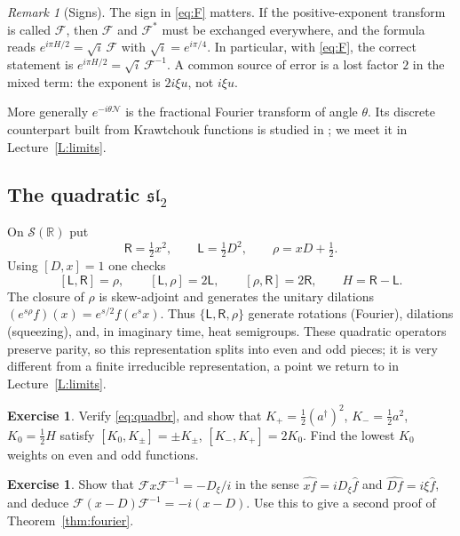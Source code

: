 \documentclass[11pt,reqno]{amsart}
\theoremstyle{definition}
\newtheorem{exercise}[theorem]{Exercise}
\theoremstyle{remark}
\newtheorem{remark}[theorem]{Remark}
\newcommand{\R}{\mathbb R}
\newcommand{\F}{\mathcal F}
\newcommand{\NN}{\mathcal N}
\begin{document}
\begin{remark}[Signs]
The sign in \eqref{eq:F} matters. If the positive-exponent transform is
called $\F$, then $\F$ and $\F^*$ must be exchanged everywhere, and the
formula reads $e^{i\pi H/2}=\sqrt i\,\F$ with $\sqrt i=e^{i\pi/4}$.
In particular, with \eqref{eq:F}, the correct statement is
$e^{i\pi H/2}=\sqrt i\,\F^{-1}$. A common source of error is a lost
factor $2$ in the mixed term: the exponent is $2i\xi u$, not $i\xi u$.
\end{remark}
More generally $e^{-i\theta\NN}$ is the fractional Fourier transform of
angle $\theta$. Its discrete counterpart built from Krawtchouk functions
is studied in \cite{AtakishievWolf1997}; we meet it in
Lecture~\ref{L:limits}.

\subsection{The quadratic $\mathfrak{sl}_2$}
On $\mathcal S(\R)$ put
\begin{equation}\label{eq:quad}
\mathsf R=\tfrac12x^2,\qquad \mathsf L=\tfrac12D^2,\qquad \rho=xD+\tfrac12.
\end{equation}
Using $[D,x]=1$ one checks
\begin{equation}\label{eq:quadbr}
[\mathsf L,\mathsf R]=\rho,\qquad[\mathsf L,\rho]=2\mathsf L,\qquad
[\rho,\mathsf R]=2\mathsf R,\qquad H=\mathsf R-\mathsf L.
\end{equation}
The closure of $\rho$ is skew-adjoint and generates the unitary
dilations $(e^{s\rho}f)(x)=e^{s/2}f(e^sx)$. Thus
$\{\mathsf L,\mathsf R,\rho\}$ generate rotations (Fourier),
dilations (squeezing), and, in imaginary time, heat semigroups. These
quadratic operators preserve parity, so this representation splits into
even and odd pieces; it is very different from a finite irreducible
representation, a point we return to in Lecture~\ref{L:limits}.

\begin{exercise}
Verify \eqref{eq:quadbr}, and show that
$K_+=\frac12(a^\dagger)^2$, $K_-=\frac12a^2$, $K_0=\frac12H$ satisfy
$[K_0,K_\pm]=\pm K_\pm$, $[K_-,K_+]=2K_0$. Find the lowest $K_0$
weights on even and odd functions.
\end{exercise}
\begin{exercise}
Show that $\F x\F^{-1}=-D_\xi/i$ in the sense
$\widehat{xf}=iD_\xi\widehat f$ and $\widehat{Df}=i\xi\widehat f$, and
deduce $\F(x-D)\F^{-1}=-i(x-D)$. Use this to give a second proof of
Theorem~\ref{thm:fourier}.
\end{exercise}
\end{document}
